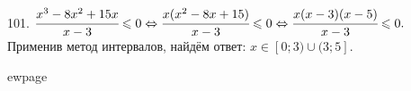 101. $\cfrac{x^3-8x^2+15x}{x-3}\leqslant0\Leftrightarrow \cfrac{x(x^2-8x+15)}{x-3}\leqslant0\Leftrightarrow\cfrac{x(x-3)(x-5)}{x-3}\leqslant0.$ Применив метод интервалов, найдём ответ: $x\in[0;3)\cup(3;5].$
\begin{figure}[ht!]
\end{figure}

ewpage
